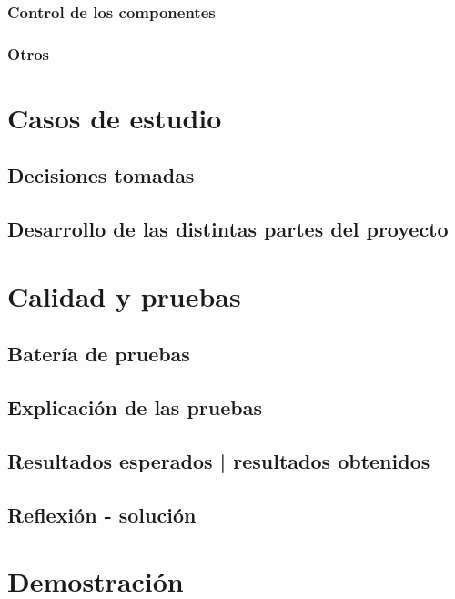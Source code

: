 \subsection{Control de los componentes}

\subsection{Otros}


\chapter{Casos de estudio}

\section{Decisiones tomadas}

\section{Desarrollo de las distintas partes del proyecto}


\chapter{Calidad y pruebas}

\section{Batería de pruebas}

\section{Explicación de las pruebas}

\section{Resultados esperados | resultados obtenidos}

\section{Reflexión - solución}


\chapter{Demostración}

